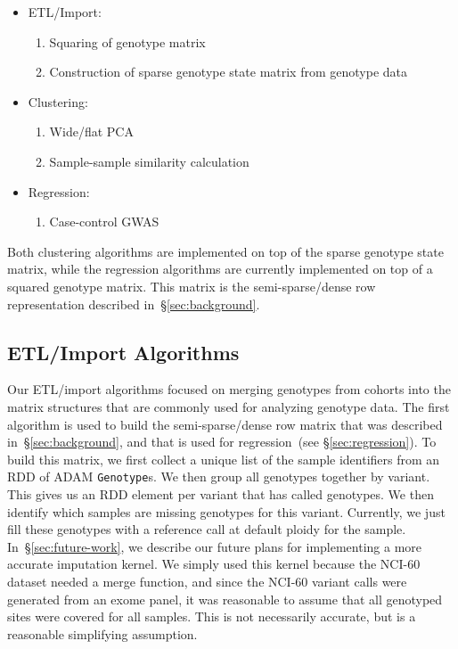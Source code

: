 \documentclass[11pt]{article} %
\begin{document}
\begin{itemize}
\item ETL/Import:
\begin{enumerate}
\item Squaring of genotype matrix
\item Construction of sparse genotype state matrix from genotype data
\end{enumerate}
\item Clustering:
\begin{enumerate}
\item Wide/flat PCA
\item Sample-sample similarity calculation
\end{enumerate}
\item Regression:
\begin{enumerate}
\item Case-control GWAS
\end{enumerate}
\end{itemize}

Both clustering algorithms are implemented on top of the sparse genotype state
matrix, while the regression algorithms are currently implemented on top of a
squared genotype matrix. This matrix is the semi-sparse/dense row representation
described in~\S\ref{sec:background}.

\subsection{ETL/Import Algorithms}
\label{sec:etl-import}

Our ETL/import algorithms focused on merging genotypes from cohorts into the
matrix structures that are commonly used for analyzing genotype data. The first
algorithm is used to build the semi-sparse/dense row matrix that was described
in~\S\ref{sec:background}, and that is used for regression~(see
\S\ref{sec:regression}). To build this matrix, we first collect a unique list
of the sample identifiers from an \textsc{RDD} of \textsc{ADAM}
\texttt{Genotype}s. We then group all genotypes together by variant. This gives
us an \textsc{RDD} element per variant that has called genotypes. We then
identify which samples are missing genotypes for this variant. Currently, we
just fill these genotypes with a reference call at default ploidy for the
sample. In~\S\ref{sec:future-work}, we describe our future plans for
implementing a more accurate imputation kernel. We simply used this kernel
because the NCI-60 dataset needed a merge function, and since the NCI-60
variant calls were generated from an exome panel, it was reasonable to assume
that all genotyped sites were covered for all samples. This is not necessarily
accurate, but is a reasonable simplifying assumption.
\end{document}
